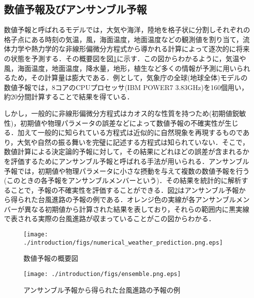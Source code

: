 \subsection{数値予報及びアンサンブル予報 \label{subsec:conventional-weather-forecast}}
数値予報と呼ばれるモデルでは，大気や海洋，陸地を格子状に分割しそれぞれの格子点にある時刻の気温，風，海面温度，地面温度などの観測値を割り当て，流体力学や熱力学的な非線形偏微分方程式から導かれる計算によって逐次的に将来の状態を予測する\cite{KishochouNWP}\cite{77785}．その概要図を図\ref{fig:conventional-weather-forecast}に示す．この図からわかるように，気温や風，海面温度，地面温度，降水量，地形，植生など多くの情報が予測に用いられるため，その計算量は膨大である．例として，気象庁の全球(地球全体)モデルの数値予報では，8コアのCPUプロセッサ(IBM POWER7 3.83GHz)を160個用い，約20分間計算することで結果を得ている\cite{Aranami2016}．

しかし，一般的に非線形偏微分方程式はカオス的な性質を持つため(初期値鋭敏性)\cite{hilborn2000chaos}，初期値や物理パラメータの誤差などによって数値予報の不確実性が生じる．加えて一般的に知られている方程式は近似的に自然現象を再現するものであり，大気や自然の振る舞いを完璧に記述する方程式は知られていない\cite{nwpkaisetu2023}．そこで，数値計算による決定論的予報に対して，その結果にどれほどの誤差が含まれるかを評価するためにアンサンブル予報と呼ばれる手法が用いられる\cite{nwpkaisetu2023}．アンサンブル予報では，初期値や物理パラメータに小さな摂動を与えて複数の数値予報を行う(このときの各予報をアンサンブルメンバーという)．その結果を統計的に解析することで，予報の不確実性を評価することができる．図\ref{fig:ensemble-forecast}はアンサンブル予報から得られた台風進路の予報の例である\cite{nwpensemble2018}．オレンジ色の実線が各アンサンブルメンバーが異なる初期値から計算された結果を表しており，それらの範囲内に黒実線で表される実際の台風進路が収まっていることがこの図からわかる．

\begin{figure}[bp]
    \centering
    \texttt{[image: ./introduction/figs/numerical\_weather\_prediction.png.eps]}
    \caption{数値予報の概要図\cite{KishochouNWP}}
    \label{fig:conventional-weather-forecast}
\end{figure}

\begin{figure}[bp]
    \centering
    \texttt{[image: ./introduction/figs/ensemble.png.eps]}
    \caption{アンサンブル予報から得られた台風進路の予報の例\cite{nwpensemble2018}}
    \label{fig:ensemble-forecast}
\end{figure}

